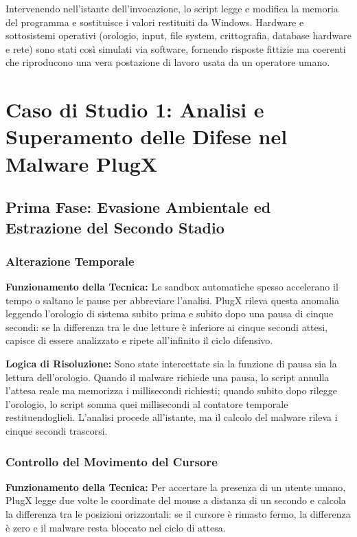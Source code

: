 \documentclass[11pt, a4paper]{article}
\begin{document}
	Intervenendo nell'istante dell'invocazione, lo script legge e modifica la memoria del programma e sostituisce i valori restituiti da Windows. Hardware e sottosistemi operativi (orologio, input, file system, crittografia, database hardware e rete) sono stati così simulati via software, fornendo risposte fittizie ma coerenti che riproducono una vera postazione di lavoro usata da un operatore umano.
	
	\section{Caso di Studio 1: Analisi e Superamento delle Difese nel Malware PlugX}
	
	\subsection{Prima Fase: Evasione Ambientale ed Estrazione del Secondo Stadio}
	
	\subsubsection{Alterazione Temporale}
	
	\textbf{Funzionamento della Tecnica:} Le sandbox automatiche spesso accelerano il tempo o saltano le pause per abbreviare l'analisi. PlugX rileva questa anomalia leggendo l'orologio di sistema subito prima e subito dopo una pausa di cinque secondi: se la differenza tra le due letture è inferiore ai cinque secondi attesi, capisce di essere analizzato e ripete all'infinito il ciclo difensivo.
	
	\textbf{Logica di Risoluzione:} Sono state intercettate sia la funzione di pausa sia la lettura dell'orologio. Quando il malware richiede una pausa, lo script annulla l'attesa reale ma memorizza i millisecondi richiesti; quando subito dopo rilegge l'orologio, lo script somma quei millisecondi al contatore temporale restituendoglieli. L'analisi procede all'istante, ma il calcolo del malware rileva i cinque secondi trascorsi.
	
	\subsubsection{Controllo del Movimento del Cursore}
	
	\textbf{Funzionamento della Tecnica:} Per accertare la presenza di un utente umano, PlugX legge due volte le coordinate del mouse a distanza di un secondo e calcola la differenza tra le posizioni orizzontali: se il cursore è rimasto fermo, la differenza è zero e il malware resta bloccato nel ciclo di attesa.
	
\end{document}
